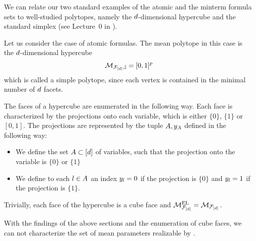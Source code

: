 
We can relate our two standard examples of the atomic and the minterm formula sets to well-studied polytopes, namely the $d$-dimensional hypercube and the standard simplex (see Lecture~0 in \cite{ziegler_lectures_2013}).

\begin{example}\label{exa:atomicFormulasHypercube}
    Let us consider the case of atomic formulas. %
    The mean polytope in this case is the $d$-dimensional hypercube
    \begin{align*}
        \mathcal{M}_{\mathcal{F}_{[d]},\mathbb{I}} = [0,1]^{p}
    \end{align*}
    which is called a simple polytope, since each vertex is contained in the minimal number of $d$ facets.

    The faces of a hypercube are enumerated in the following way.
    Each face is characterized by the projections onto each variable, which is either $\{0\}$, $\{1\}$ or $[0,1]$.
    The projections are represented by the tuple $A,y_{A}$ defined in the following way:
    \begin{itemize}
        \item We define the set $A\subset[d]$ of variables, such that the projection onto the variable is $\{0\}$ or $\{1\}$
        \item We define to each $l\in A$ an index $y_{l}=0$ if the projection is $\{0\}$ and $y_{l}=1$ if the projection is $\{1\}$.
    \end{itemize}


    Trivially, each face of the hypercube is a cube face and $\mathcal{M}^{\mathrm{EL}}_{\mathcal{F}_{[d]}}=\mathcal{M}_{\mathcal{F}_{[d]}}$.
\end{example}

With the findings of the above sections and the enumeration of cube faces, we can not characterize the set of mean parameters realizable by \HybridLogicNetworks{}.

